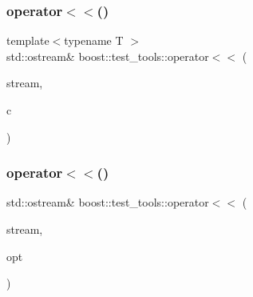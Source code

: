 \mbox{\label{namespaceboost_1_1test__tools_a40a0ac50cd89cb00fd1693dfb694f60a}} 
\subsubsection{\texorpdfstring{operator$<$$<$()}{operator<<()}\hspace{0.1cm}{\footnotesize\ttfamily [3/4]}}
{\footnotesize\ttfamily template$<$typename T $>$ \\
std\+::ostream\& boost\+::test\+\_\+tools\+::operator$<$$<$ (\begin{DoxyParamCaption}\item[{std\+::ostream \&}]{stream,  }\item[{const std\+::vector$<$ T $>$ \&}]{c }\end{DoxyParamCaption})}

\mbox{\label{namespaceboost_1_1test__tools_a4f23c1f3eb9d46fdf1bc0e40e5d63a32}} 
\subsubsection{\texorpdfstring{operator$<$$<$()}{operator<<()}\hspace{0.1cm}{\footnotesize\ttfamily [4/4]}}
{\footnotesize\ttfamily std\+::ostream\& boost\+::test\+\_\+tools\+::operator$<$$<$ (\begin{DoxyParamCaption}\item[{std\+::ostream \&}]{stream,  }\item[{const \mbox{\hyperlink{class_closure_options}{Closure\+Options}} \&}]{opt }\end{DoxyParamCaption})}

